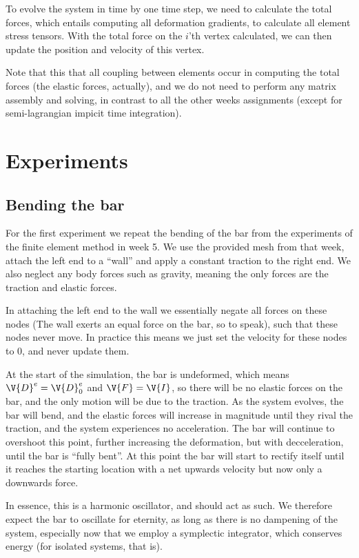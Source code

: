 \documentclass[sigconf]{acmart}
\begin{document}
To evolve the system in time by one time step, we need to calculate the total forces, which entails computing all deformation gradients, to calculate all element stress tensors. With the total force on the $ i $'th vertex calculated, we can then update the position and velocity of this vertex.

Note that this that all coupling between elements occur in computing the total forces (the elastic forces, actually), and we do not need to perform any matrix assembly and solving, in contrast to all the other weeks assignments (except for semi-lagrangian impicit time integration).



\section{Experiments}
\subsection{Bending the bar}
For the first experiment we repeat the bending of the bar from the experiments of the finite element method in week 5. We use the provided mesh from that week, attach the left end to a ``wall'' and apply a constant traction to the right end. We also neglect any body forces such as gravity, meaning the only forces are the traction and elastic forces.

In attaching the left end to the wall we essentially negate all forces on these nodes (The wall exerts an equal force on the bar, so to speak), such that these nodes never move. In practice this means we just set the velocity for these nodes to 0, and never update them.

At the start of the simulation, the bar is undeformed, which means $ \V{D}^e = \V{D}^e_0 $ and $ \V{F} = \V{I} $, so there will be no elastic forces on the bar, and the only motion will be due to the traction. As the system evolves, the bar will bend, and the elastic forces will increase in magnitude until they rival the traction, and the system experiences no acceleration. The bar will continue to overshoot this point, further increasing the deformation, but with decceleration, until the bar is ``fully bent''. At this point the bar will start to rectify itself until it reaches the starting location with a net upwards velocity but now only a downwards force.

In essence, this is a harmonic oscillator, and should act as such. We therefore expect the bar to oscillate for eternity, as long as there is no dampening of the system, especially now that we employ a symplectic integrator, which conserves energy (for isolated systems, that is).
\end{document}
